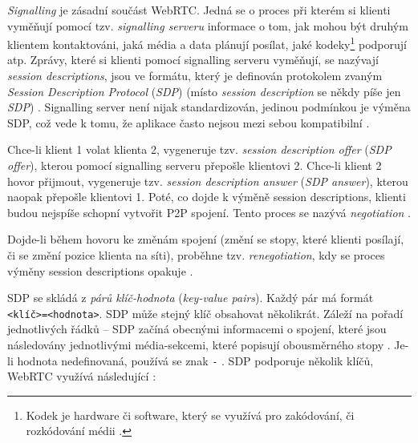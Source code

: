 \textit{Signalling} je zásadní součást WebRTC. Jedná se o proces při kterém si
klienti vyměňují pomocí tzv. \textit{signalling serveru} informace o tom, jak
mohou být druhým klientem kontaktováni, jaká média a data plánují posílat, jaké
kodeky\footnote{Kodek je hardware či software, který se využívá pro zakódování,
či rozkódování médii \cite{Britannica-Codec,TechTarget-Codec}.} podporují atp.
Zprávy, které si klienti pomocí signalling serveru vyměňují, se nazývají
\textit{session descriptions}, jsou ve formátu, který je definován protokolem
zvaným \textit{Session Description Protocol} (\textit{SDP}) (místo
\textit{session description} se někdy píše jen \textit{SDP})
\cite{WebRTCForTheCurious}. Signalling server není nijak standardizován, jedinou
podmínkou je výměna SDP, což vede k tomu, že aplikace často nejsou mezi sebou
kompatibilní \cite{MDN-Web-SignalingAndVideoCalling}.

Chce-li klient 1 volat klienta 2, vygeneruje tzv. \textit{session description
offer} (\textit{SDP offer}), kterou pomocí signalling serveru přepošle klientovi
2. Chce-li klient 2 hovor přijmout, vygeneruje tzv. \textit{session description
answer} (\textit{SDP answer}), kterou naopak přepošle klientovi 1. Poté, co
dojde k výměně session descriptions, klienti budou nejspíše schopní vytvořit P2P
spojení. Tento proces se nazývá
\textit{negotiation}
\cite{WebRTCForTheCurious,MozillaBlog-PerfectNegotiation}.

Dojde-li během hovoru ke změnám spojení (změní se stopy, které klienti posílají,
či se změní pozice klienta na síti), proběhne tzv. \textit{renegotiation}, kdy
se proces výměny session descriptions opakuje
\cite{MozillaBlog-PerfectNegotiation}.

SDP se skládá z \textit{párů klíč-hodnota} (\textit{key-value pairs}). Každý pár
má formát \texttt{<klíč>=<hodnota>}. SDP může stejný klíč obsahovat
několikrát. Záleží na pořadí jednotlivých řádků -- SDP začíná obecnými
informacemi o spojení, které jsou následovány jednotlivými média-sekcemi, které
popisují obousměrného stopy \cite{WebRTCForTheCurious}. Je-li hodnota
nedefinovaná, používá se znak \texttt{-} \cite{IETF-RFC8866}. SDP
podporuje několik klíčů, WebRTC využívá následující
\cite{WebRTCForTheCurious,IETF-RFC8866}:

